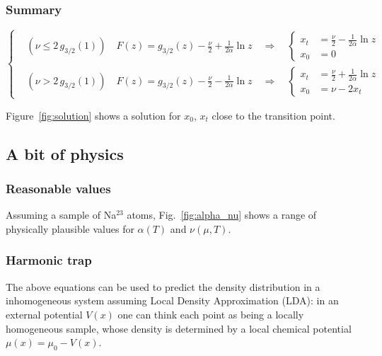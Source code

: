 \documentclass{article}
\begin{document}
\subsubsection*{Summary}
\begin{equation*}
  \left\{
  \begin{aligned}
    &(\nu \leq 2\,g_{3/2}(1)) \quad F(z) = g_{3/2}(z) - \frac{\nu}{2} + \frac{1}{2\alpha}\ln z \quad\Rightarrow\quad
      \left\{
      \begin{aligned}
      x_t &= \frac{\nu}{2} - \frac{1}{2\alpha}\ln z \\
      x_0 &= 0
      \end{aligned}\right. \\
    &(\nu > 2\,g_{3/2}(1)) \quad F(z) = g_{3/2}(z) - \frac{\nu}{2} - \frac{1}{2\alpha}\ln z \quad\Rightarrow\quad
      \left\{
      \begin{aligned}
        x_t &= \frac{\nu}{2} + \frac{1}{2\alpha}\ln z \\
        x_0 &= \nu - 2 x_t
      \end{aligned}\right.
  \end{aligned}
  \right.
\end{equation*}

Figure~\ref{fig:solution} shows a solution for $x_0$, $x_t$ close to the transition point.

\subsection*{A bit of physics}
\subsubsection*{Reasonable values}

Assuming a sample of Na$^{23}$ atoms, Fig.~\ref{fig:alpha_nu} shows a range of physically plausible values for $\alpha(T)$ and $\nu(\mu, T)$.

\subsubsection*{Harmonic trap}

The above equations can be used to predict the density distribution in a inhomogeneous system assuming Local Density Approximation (LDA): in an external potential $V(x)$ one can think each point as being a locally homogeneous sample, whose density is determined by a local chemical potential $\mu(x) = \mu_0 - V(x)$.
\end{document}

